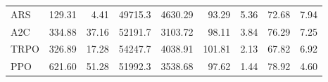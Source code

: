 \begin{samepage}
\begin{center}
\begin{tabular}{l|rr|rr|rr|rr}
    ARS          &   129.31 &     4.41 &    49715.3 &    4630.29 &   93.29 &    5.36 &   72.68 &    7.94 \\
    A2C          &   334.88 &    37.16 &    52191.7 &    3103.72 &   98.11 &    3.84 &   76.29 &    7.25 \\
    TRPO         &   326.89 &    17.28 &    54247.7 &    4038.91 &  101.81 &    2.13 &   67.82 &    6.92 \\
    PPO          &   621.60 &    51.28 &    51992.3 &    3538.68 &   97.62 &    1.44 &   78.92 &    4.60 \\
    \bottomrule
  \end{tabular}
\end{center}
\end{samepage}

